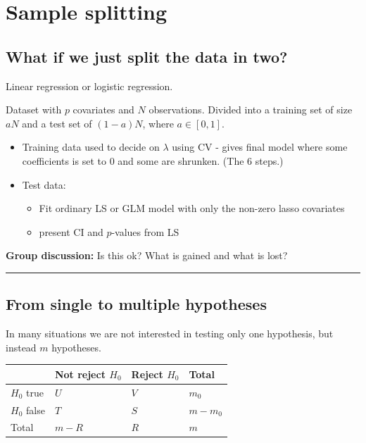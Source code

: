 \documentclass[
  letterpaper,
  DIV=11,
  numbers=noendperiod]{scrartcl}
\providecommand{\tightlist}{%
  \setlength{\itemsep}{0pt}\setlength{\parskip}{0pt}}\usepackage{longtable,booktabs,array}
\begin{document}
\hypertarget{sample-splitting}{%
\section{Sample splitting}\label{sample-splitting}}

\hypertarget{what-if-we-just-split-the-data-in-two}{%
\subsection{What if we just split the data in
two?}\label{what-if-we-just-split-the-data-in-two}}

Linear regression or logistic regression.

Dataset with \(p\) covariates and \(N\) observations. Divided into a
training set of size \(aN\) and a test set of \((1-a)N\), where
\(a \in [0,1]\).

\begin{itemize}
\item
  Training data used to decide on \(\lambda\) using CV - gives final
  model where some coefficients is set to 0 and some are shrunken. (The
  6 steps.)
\item
  Test data:

  \begin{itemize}
  \tightlist
  \item
    Fit ordinary LS or GLM model with only the non-zero lasso covariates
  \item
    present CI and \(p\)-values from LS
  \end{itemize}
\end{itemize}

\textbf{Group discussion:} Is this ok? What is gained and what is lost?

\begin{center}\rule{0.5\linewidth}{0.5pt}\end{center}

\hypertarget{from-single-to-multiple-hypotheses}{%
\subsection{From single to multiple
hypotheses}\label{from-single-to-multiple-hypotheses}}

In many situations we are not interested in testing only one hypothesis,
but instead \(m\) hypotheses.

\begin{longtable}[]{@{}llll@{}}
\toprule()
& Not reject \(H_0\) & Reject \(H_0\) & Total \\
\midrule()
\endhead
\(H_0\) true & \(U\) & \(V\) & \(m_0\) \\
\(H_0\) false & \(T\) & \(S\) & \(m - m_0\) \\
Total & \(m-R\) & \(R\) & \(m\) \\
\bottomrule()
\end{longtable}
\end{document}
